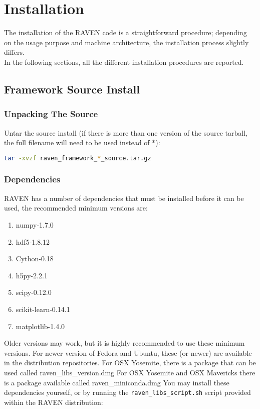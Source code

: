 \section{Installation}
The installation of the RAVEN code is a straightforward procedure; depending on the usage purpose
and machine architecture, the installation process slightly differs. \\In the following sections, all the different
installation procedures are reported.

\subsection{Framework Source Install}

\subsubsection{Unpacking The Source}

Untar the source install (if there is more than one version of the
source tarball, the full filename will need to be used instead of *):

\begin{lstlisting}[language=bash]
tar -xvzf raven_framework_*_source.tar.gz
\end{lstlisting}

\subsubsection{Dependencies}
\label{raven_dependencies}
RAVEN has a number of dependencies that must be installed before it can be used,
the recommended minimum versions are:

\begin{enumerate}
\item numpy-1.7.0
\item hdf5-1.8.12
\item Cython-0.18
\item h5py-2.2.1
\item scipy-0.12.0
\item scikit-learn-0.14.1
\item matplotlib-1.4.0
\end{enumerate}

Older versions may work, but it is highly recommended to use these
minimum versions.  For newer version of Fedora and Ubuntu, these (or
newer) are available in the distribution repositories.  For OSX
Yosemite, there is a package that can be used called
raven\_libs\_version.dmg For OSX Yosemite and OSX Mavericks there is a
package available called raven\_miniconda.dmg
%
You may install these dependencies yourself, or by running the
\texttt{raven\_libs\_script.sh} script provided within the RAVEN distribution:

